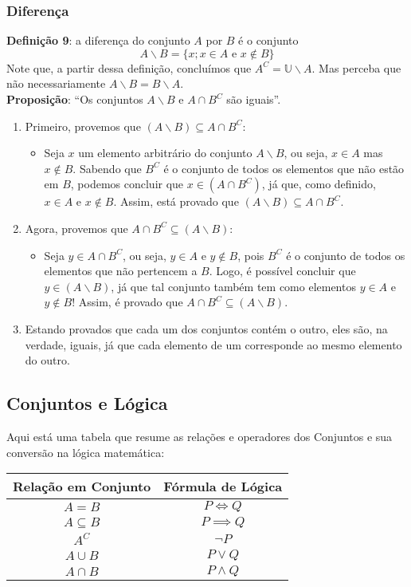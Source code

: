 \documentclass[13pt,letterpaper]{article}
\begin{document}
\subsubsection{Diferença}
\textbf{Definição 9}: a diferença do conjunto $A$ por $B$ é o conjunto
\begin{displaymath}
    A \backslash B = \{x; x \in A \text{ e } x \notin B \}
\end{displaymath}
Note que, a partir dessa definição, concluímos que $A^C = \mathbb{U} \backslash A$. Mas perceba que não necessariamente $A \backslash B = B \backslash A$. 
\\
\textbf{Proposição}: \enquote{Os conjuntos $A \backslash B$ e $A \cap B^C$ são iguais}.
\begin{enumerate}
    \item Primeiro, provemos que $(A \backslash B) \subseteq A \cap B^C$:
    \begin{itemize}
        \item Seja $x$ um elemento arbitrário do conjunto $A \backslash B$, ou seja, $x \in A$ mas $x \notin B$. Sabendo que $B^C$ é o conjunto de todos os elementos que não estão em $B$, podemos concluir que $x \in (A \cap B^C)$, já que, como definido, $x \in A$ e $x \notin B$. Assim, está provado que $(A \backslash B) \subseteq A \cap B^C$.
    \end{itemize}
    \item Agora, provemos que $A \cap B^C \subseteq (A \backslash B)$:
    \begin{itemize}
        \item Seja $y \in A \cap B^C$, ou seja, $y \in A$ e $y \notin B$, pois $B^C$ é o conjunto de todos os elementos que não pertencem a $B$. Logo, é possível concluir que $y \in (A \backslash B)$, já que tal conjunto também tem como elementos $y \in A$ e $y \notin B$! Assim, é provado que $A \cap B^C \subseteq (A \backslash B)$.
    \end{itemize}
    \item Estando provados que cada um dos conjuntos contém o outro, eles são, na verdade, iguais, já que cada elemento de um corresponde ao mesmo elemento do outro.
\end{enumerate}
\subsection{Conjuntos e Lógica}
Aqui está uma tabela que resume as relações e operadores dos Conjuntos e sua conversão na lógica matemática:
\begin{center}
    \begin{tabular}{c|c}
        Relação em Conjunto & Fórmula de Lógica  \\
        \hline
        $A = B$ & $P \iff Q$ \\
        $A \subseteq B$ & $P \implies Q $\\
        $A^C $ & $ \lnot P$ \\
        $A \cup B$ & $P \vee Q $ \\
        $ A \cap B$ & $P \land Q $ \\
    \end{tabular}
\end{center}
\end{document}

